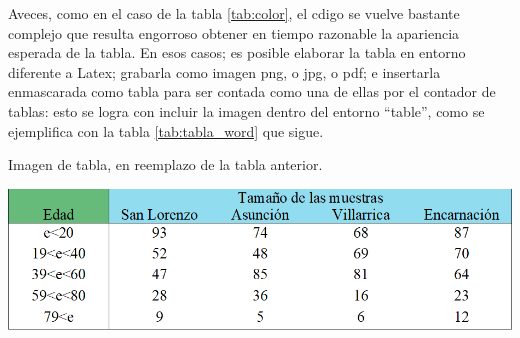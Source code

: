 Aveces, como en el caso de la tabla \ref{tab:color}, el cdigo se vuelve bastante complejo que resulta engorroso obtener en tiempo razonable la apariencia esperada de la tabla. En esos casos; es posible elaborar la tabla en entorno diferente a Latex; grabarla como imagen png, o jpg, o pdf; e insertarla enmascarada como tabla para ser contada como una de ellas por el contador de tablas: esto se logra con incluir la imagen dentro del entorno ``table'', como se ejemplifica con la tabla \ref{tab:tabla_word} que sigue.

\begin{table}[H]
	\begin{center}
		\caption{Imagen de tabla, en reemplazo de la tabla anterior.}
		\label{tab:tabla_word}
		\includegraphics[scale=.65]{./capitulo_04/tabla_word.png}
	\end{center}
\end{table}

